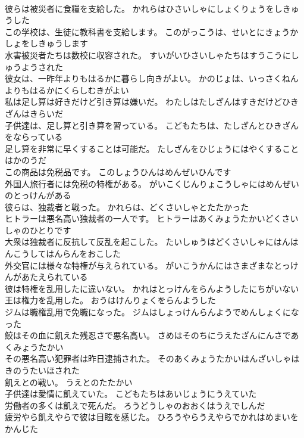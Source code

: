 \documentclass[8pt]{extreport}
\begin{document}
\begin{CJK}{UTF8}{min}
\\	彼らは被災者に食糧を支給した。	かれらはひさいしゃにしょくりょうをしきゅうした 
\\	この学校は、生徒に教科書を支給します。	このがっこうは、せいとにきょうかしょをしきゅうします 
\\	水害被災者たちは数校に収容された。	すいがいひさいしゃたちはすうこうにしゅうようされた 
\\	彼女は、一昨年よりもはるかに暮らし向きがよい。	かのじょは、いっさくねんよりもはるかにくらしむきがよい 
\\	私は足し算は好きだけど引き算は嫌いだ。	わたしはたしざんはすきだけどひきざんはきらいだ 
\\	子供達は、足し算と引き算を習っている。	こどもたちは、たしざんとひきざんをならっている 
\\	足し算を非常に早くすることは可能だ。	たしざんをひじょうにはやくすることはかのうだ 
\\	この商品は免税品です。	このしょうひんはめんぜいひんです 
\\	外国人旅行者には免税の特権がある。	がいこくじんりょこうしゃにはめんぜいのとっけんがある 
\\	彼らは、独裁者と戦った。	かれらは、どくさいしゃとたたかった 
\\	ヒトラーは悪名高い独裁者の一人です。	ヒトラーはあくみょうたかいどくさいしゃのひとりです 
\\	大衆は独裁者に反抗して反乱を起こした。	たいしゅうはどくさいしゃにはんはんこうしてはんらんをおこした 
\\	外交官には様々な特権が与えられている。	がいこうかんにはさまざまなとっけんがあたえられている 
\\	彼は特権を乱用したに違いない。	かれはとっけんをらんようしたにちがいない 
\\	王は権力を乱用した。	おうはけんりょくをらんようした 
\\	ジムは職権乱用で免職になった。	ジムはしょっけんらんようでめんしょくになった 
\\	鮫はその血に飢えた残忍さで悪名高い。	さめはそのちにうえたざんにんさであくみょうたかい 
\\	その悪名高い犯罪者は昨日逮捕された。	そのあくみょうたかいはんざいしゃはきのうたいほされた 
\\	飢えとの戦い。	うえとのたたかい 
\\	子供達は愛情に飢えていた。	こどもたちはあいじょうにうえていた 
\\	労働者の多くは飢えで死んだ。	ろうどうしゃのおおくはうえでしんだ 
\\	疲労やら飢えやらで彼は目眩を感じた。	ひろうやらうえやらでかれはめまいをかんじた 

\end{CJK}
\end{document}
